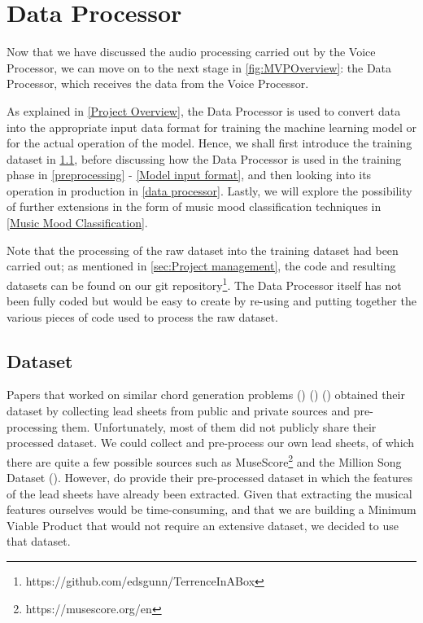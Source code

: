 
\chapter{Data Processor} %
\label{Chapter3} %

Now that we have discussed the audio processing carried out by the Voice Processor, we can move on to the next stage in \cref{fig:MVPOverview}: the Data Processor, which receives the data from the Voice Processor.

As explained in \cref{Project Overview}, the Data Processor is used to convert data into the appropriate input data format for training the machine learning model or for the actual operation of the model. Hence, we shall first introduce the training dataset in \cref{Intro to Dataset}, before discussing how the Data Processor is used in the training phase in \cref{preprocessing} - \cref{Model input format}, and then looking into its operation in production in \cref{data processor}. Lastly, we will explore the possibility of further extensions in the form of music mood classification techniques in \cref{Music Mood Classification}.

Note that the processing of the raw dataset into the training dataset had been carried out; as mentioned in \cref{sec:Project management}, the code and resulting datasets can be found on our git repository\footnote{https://github.com/edsgunn/TerrenceInABox}. The Data Processor itself has not been fully coded but would be easy to create by re-using and putting together the various pieces of code used to process the raw dataset.

\section{Dataset}
\label{Intro to Dataset}
Papers that worked on similar chord generation problems (\cite{MySong}) (\cite{BLSTM}) (\cite{MLForChords}) obtained their dataset by collecting lead sheets from public and private sources and pre-processing them. Unfortunately, most of them did not publicly share their processed dataset. We could collect and pre-process our own lead sheets, of which there are quite a few possible sources such as MuseScore\footnote{https://musescore.org/en} and the Million Song Dataset (\cite{Bertin-Mahieux2011}). However, \cite{BLSTM} do provide their pre-processed dataset in which the features of the lead sheets have already been extracted. Given that extracting the musical features ourselves would be time-consuming, and that we are building a Minimum Viable Product that would not require an extensive dataset, we decided to use that dataset.

